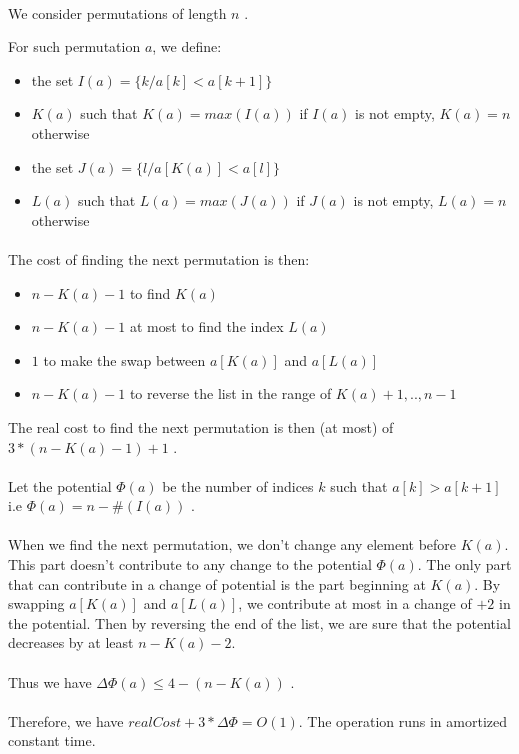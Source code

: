 

\paragraph{}
We consider permutations of length $n$ .

For such permutation $a$, we define:
\begin{itemize}
\item{} the set $I(a)=\{k/ a[k]<a[k+1]\}$
\item{} $K(a)$ such that $K(a)= max(I(a))$ if $I(a)$ is not empty, $K(a)=n$ otherwise
\item{} the set $J(a)=\{l/ a[K(a)]<a[l]\}$
\item{} $L(a)$ such that $L(a) = max(J(a))$ if $J(a)$ is not empty, $L(a)=n$ otherwise
\end{itemize}

\paragraph{}
The cost of finding the next permutation is then:
\begin{itemize}
\item{} $n-K(a)-1$ to find $K(a)$
\item{} $n-K(a)-1$ at most to find the index $L(a)$
\item{} $1$ to make the swap between $a[K(a)]$ and $a[L(a)]$
\item{} $n-K(a)-1$ to reverse the list in the range of $K(a)+1,..,n-1$
\end{itemize}
The real cost to find the next permutation is then (at most) of $3*(n-K(a)-1)+1$ .

\paragraph{}
\paragraph{}
Let the potential $\Phi(a)$ be the number of indices $k$ such that $a[k]>a[k+1]$
\newline
i.e $\Phi(a)=n-\#(I(a))$ .

\paragraph{}
When we find the next permutation, we don't change any element before $K(a)$. This part doesn't contribute to any change to the potential $\Phi(a)$. The only part that can contribute in a change of potential is the part beginning at $K(a)$. By swapping $a[K(a)]$ and $a[L(a)]$, we contribute at most in a change of $+2$ in the potential. Then by reversing the end of the list, we are sure that the potential decreases by at least $n-K(a)-2$.
\paragraph{}
Thus we have $\Delta\Phi(a)\leq{4-(n-K(a))}$ .

\paragraph{}
\paragraph{}
Therefore, we have $realCost+3*\Delta\Phi=O(1)$. The operation runs in amortized constant time.